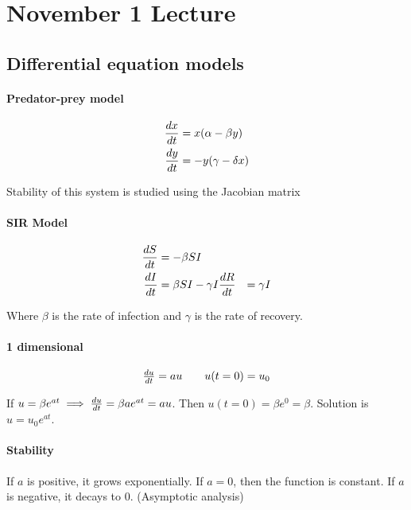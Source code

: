 \section{November 1 Lecture}

\subsection{Differential equation models}

\paragraph{Predator-prey model}

\begin{align*}
  {dx \over dt} &= x (\alpha - \beta y) \\
  {dy \over dt} &= -y (\gamma - \delta x)
\end{align*}

Stability of this system is studied using the Jacobian matrix

\paragraph{SIR Model}

\begin{align*}
  {dS \over dt} &= -\beta S I\\
  {dI \over dt} &= \beta SI - \gamma I
  {dR \over dt} &= \gamma I\\
\end{align*}

Where $\beta$ is the rate of infection and $\gamma$ is the rate of recovery.

\paragraph{1 dimensional}

\[
  \begin{matrix}
    {du \over dt} = au & & u(t=0) = u_0
  \end{matrix}
\]

If $u=\beta e^{at} \implies {du \over dt} = \beta a e^{at} = au$. Then $u(t=0) = \beta e^0 = \beta$. Solution is $u = u_0 e^{at}$.

\paragraph{Stability} If $a$ is positive, it grows exponentially. If $a=0$, then the function is constant. If $a$ is negative, it decays to 0. (Asymptotic analysis)

